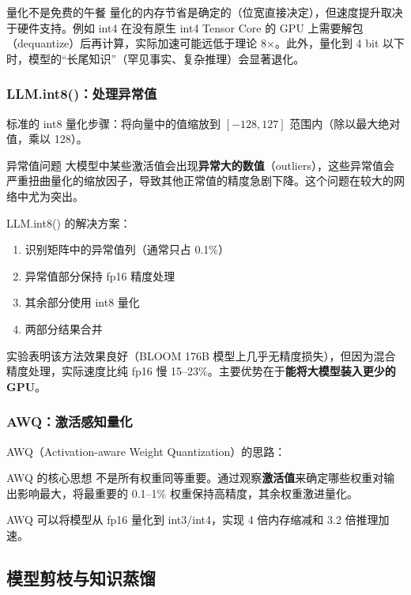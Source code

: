 \documentclass[a4paper]{article}
\begin{document}
\begin{warningbox}{量化不是免费的午餐}
量化的内存节省是确定的（位宽直接决定），但速度提升取决于硬件支持。例如 int4 在没有原生 int4 Tensor Core 的 GPU 上需要解包（dequantize）后再计算，实际加速可能远低于理论 8$\times$。此外，量化到 4 bit 以下时，模型的``长尾知识''（罕见事实、复杂推理）会显著退化。
\end{warningbox}

\subsubsection{LLM.int8()：处理异常值}

标准的 int8 量化步骤：将向量中的值缩放到 $[-128, 127]$ 范围内（除以最大绝对值，乘以 128）。

\begin{warningbox}{异常值问题}
大模型中某些激活值会出现\textbf{异常大的数值}（outliers），这些异常值会严重扭曲量化的缩放因子，导致其他正常值的精度急剧下降。这个问题在较大的网络中尤为突出。
\end{warningbox}

LLM.int8() 的解决方案：
\begin{enumerate}
    \item 识别矩阵中的异常值列（通常只占 0.1\%）
    \item 异常值部分保持 fp16 精度处理
    \item 其余部分使用 int8 量化
    \item 两部分结果合并
\end{enumerate}

实验表明该方法效果良好（BLOOM 176B 模型上几乎无精度损失），但因为混合精度处理，实际速度比纯 fp16 慢 15--23\%。主要优势在于\textbf{能将大模型装入更少的 GPU}。

\subsubsection{AWQ：激活感知量化}

AWQ（Activation-aware Weight Quantization）的思路：

\begin{importantbox}{AWQ 的核心思想}
不是所有权重同等重要。通过观察\textbf{激活值}来确定哪些权重对输出影响最大，将最重要的 0.1--1\% 权重保持高精度，其余权重激进量化。

AWQ 可以将模型从 fp16 量化到 int3/int4，实现 4 倍内存缩减和 3.2 倍推理加速。
\end{importantbox}

\subsection{模型剪枝与知识蒸馏}
\end{document}
